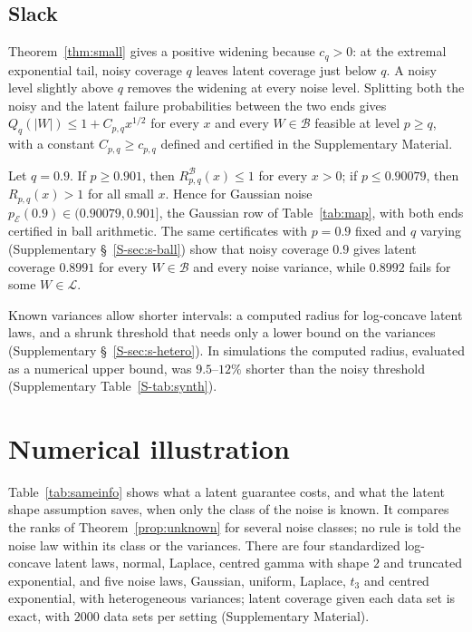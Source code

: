 \documentclass[lineno]{biometrika}
\newcommand{\LC}{\mathcal{L}}
\begin{document}
\subsection{Slack}\label{sec:slack}

Theorem~\ref{thm:small} gives a positive widening because $c_q > 0$: at the extremal exponential tail, noisy coverage $q$ leaves latent coverage just below $q$. A noisy level slightly above $q$ removes the widening at every noise level. Splitting both the noisy and the latent failure probabilities between the two ends gives $Q_q(|W|) \le 1 + C_{p,q}x^{1/2}$ for every $x$ and every $W \in \mathcal B$ feasible at level $p \ge q$, with a constant $C_{p,q} \ge c_{p,q}$ defined and certified in the Supplementary Material.

\begin{corollary}\label{cor:slack}
Let $q = 0.9$. If $p \ge 0.901$, then $R^{\mathcal B}_{p,q}(x) \le 1$ for every $x > 0$; if $p \le 0.90079$, then $R_{p,q}(x) > 1$ for all small $x$. Hence for Gaussian noise $p_{\mathcal E}(0.9) \in (0.90079, 0.901]$, the Gaussian row of Table~\ref{tab:map}, with both ends certified in ball arithmetic. The same certificates with $p = 0.9$ fixed and $q$ varying (Supplementary \S~\ref{S-sec:s-ball}) show that noisy coverage $0.9$ gives latent coverage $0.8991$ for every $W \in \mathcal B$ and every noise variance, while $0.8992$ fails for some $W \in \LC$.
\end{corollary}

\label{sec:hetero}Known variances allow shorter intervals: a computed radius for log-concave latent laws, and a shrunk threshold that needs only a lower bound on the variances (Supplementary \S~\ref{S-sec:s-hetero}). In simulations the computed radius, evaluated as a numerical upper bound, was $9.5$--$12\%$ shorter than the noisy threshold (Supplementary Table~\ref{S-tab:synth}).

\section{Numerical illustration}\label{sec:numerical}

Table~\ref{tab:sameinfo} shows what a latent guarantee costs, and what the latent shape assumption saves, when only the class of the noise is known. It compares the ranks of Theorem~\ref{prop:unknown} for several noise classes; no rule is told the noise law within its class or the variances. There are four standardized log-concave latent laws, normal, Laplace, centred gamma with shape $2$ and truncated exponential, and five noise laws, Gaussian, uniform, Laplace, $t_3$ and centred exponential, with heterogeneous variances; latent coverage given each data set is exact, with $2000$ data sets per setting (Supplementary Material).
\end{document}
